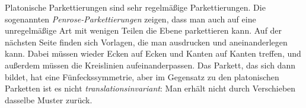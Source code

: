 \documentclass{zusammenfassung}
\begin{document}
\begin{center}
\end{center}

Platonische Parkettierungen sind sehr regelmäßige Parkettierungen. Die sogenannten \emph{Penrose-Parkettierungen}
zeigen, dass man auch auf eine unregelmäßige Art mit wenigen Teilen die Ebene parkettieren kann. Auf der nächsten Seite finden
sich Vorlagen, die man ausdrucken und aneinanderlegen kann. Dabei müssen wieder Ecken auf Ecken und Kanten auf Kanten treffen,
und außerdem müssen die Kreislinien aufeinanderpassen. Das Parkett, das sich dann bildet, hat eine Fünfeckssymmetrie, 
aber im Gegensatz zu den platonischen Parketten ist es nicht \emph{translationsinvariant}: Man erhält nicht durch Verschieben
dasselbe Muster zurück.
\end{document}
